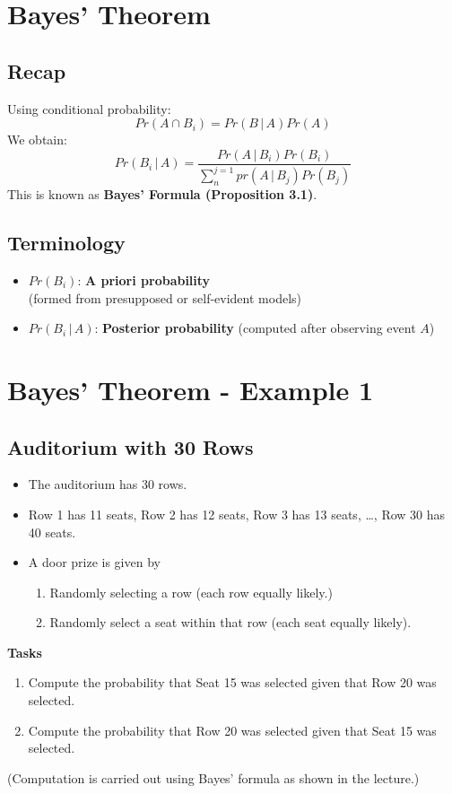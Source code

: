 \documentclass[11pt]{article}
\begin{document}
\section{Bayes' Theorem}
\subsection{Recap}
Using conditional probability:
$$Pr(A\cap B_i) = Pr(B\,|\,A)Pr(A)$$
We obtain:
$$
Pr(B_i\,|\,A) = \dfrac{Pr(A\,|\,B_i)Pr(B_i)}{\sum_{n}^{j=1}pr(A\,|\,B_j)Pr(B_j)}
$$
This is known as \textbf{Bayes' Formula (Proposition 3.1)}.
\subsection{Terminology}
\begin{itemize}
	\item $Pr(B_i)$: \textbf{A priori probability}\\
	(formed from presupposed or self-evident models)
	\item $Pr(B_i\,|\,A)$: \textbf{Posterior probability}
	(computed after observing event $A$)
\end{itemize}

\section{Bayes' Theorem - Example 1}
\subsection*{Auditorium with 30 Rows}
\begin{itemize}
	\item The auditorium has 30 rows.
	\item Row 1 has 11 seats, Row 2 has 12 seats, Row 3 has 13 seats, \dots, Row 30 has 40 seats.
	\item A door prize is given by
	\begin{enumerate}
		\item Randomly selecting a row (each row equally likely.)
		\item Randomly select a seat within that row (each seat equally likely).
	\end{enumerate}
\end{itemize}
\textbf{Tasks}
\begin{enumerate}
	\item Compute the probability that Seat 15 was selected given that Row 20 was selected.
	\item Compute the probability that Row 20 was selected given that Seat 15 was selected. 
\end{enumerate}
(Computation is carried out using Bayes' formula as shown in the lecture.)
\end{document}
